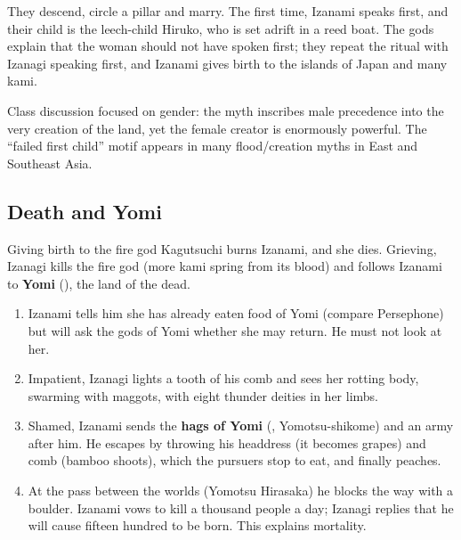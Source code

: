 They descend, circle a pillar and marry. The first time, Izanami speaks first, and their
child is the leech-child Hiruko, who is set adrift in a reed boat. The gods explain that
the woman should not have spoken first; they repeat the ritual with Izanagi speaking first,
and Izanami gives birth to the islands of Japan and many kami.

\begin{remark}
Class discussion focused on gender: the myth inscribes male precedence into the very
creation of the land, yet the female creator is enormously powerful. The ``failed first
child'' motif appears in many flood/creation myths in East and Southeast Asia.
\end{remark}

\subsection{Death and Yomi}

Giving birth to the fire god Kagutsuchi burns Izanami, and she dies. Grieving, Izanagi
kills the fire god (more kami spring from its blood) and follows Izanami to \textbf{Yomi}
(), the land of the dead.

\begin{enumerate}
  \item Izanami tells him she has already eaten food of Yomi (compare Persephone) but will
        ask the gods of Yomi whether she may return. He must not look at her.
  \item Impatient, Izanagi lights a tooth of his comb and sees her rotting body, swarming
        with maggots, with eight thunder deities in her limbs.
  \item Shamed, Izanami sends the \textbf{hags of Yomi} (, Yomotsu-shikome)
        and an army after him. He escapes by throwing his headdress (it becomes grapes)
        and comb (bamboo shoots), which the pursuers stop to eat, and finally peaches.
  \item At the pass between the worlds (Yomotsu Hirasaka) he blocks the way with a
        boulder. Izanami vows to kill a thousand people a day; Izanagi replies that he
        will cause fifteen hundred to be born. This explains mortality.
\end{enumerate}

